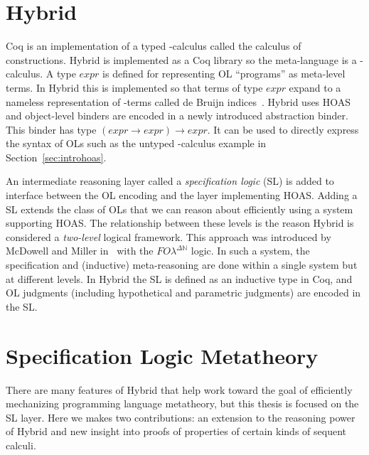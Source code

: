 \section{Hybrid}

Coq is an implementation of a typed \lambda-calculus called the calculus of constructions. Hybrid is implemented as a Coq library so the meta-language is a \lambda-calculus. A type $\mathit{expr}$ is defined for representing OL ``programs'' as meta-level terms. In Hybrid this is implemented so that terms of type $\mathit{expr}$ expand to a nameless representation of \lambda-terms called de Bruijn indices~\cite{debruijn}. Hybrid uses HOAS and object-level binders are encoded in a newly introduced abstraction binder. This binder has type $(\mathit{expr} \rightarrow \mathit{expr}) \rightarrow \mathit{expr}$. It can be used to directly express the syntax of OLs such as the untyped \lambda-calculus example in Section~\ref{sec:introhoas}.

An intermediate reasoning layer called a \emph{specification logic} (SL) is added to interface between the OL encoding and the layer implementing HOAS. Adding a SL extends the class of OLs that we can reason about efficiently using a system supporting HOAS. The relationship between these levels is the reason Hybrid is considered a \emph{two-level} logical framework. This approach was introduced by McDowell and Miller in~\cite{McDowellMiller:TOCL01} with the $\mathit{FO\lambda^{\Delta \mathbb{N}}}$ logic. In such a system, the specification and (inductive) meta-reasoning are done within a single system but at different levels. In Hybrid the SL is defined as an inductive type in Coq, and OL judgments (including hypothetical and parametric judgments) are encoded in the SL.

\section{Specification Logic Metatheory}

There are many features of Hybrid that help work toward the goal of efficiently mechanizing programming language metatheory, but this thesis is focused on the SL layer. Here we makes two contributions: an extension to the reasoning power of Hybrid and new insight into proofs of properties of certain kinds of sequent calculi.

